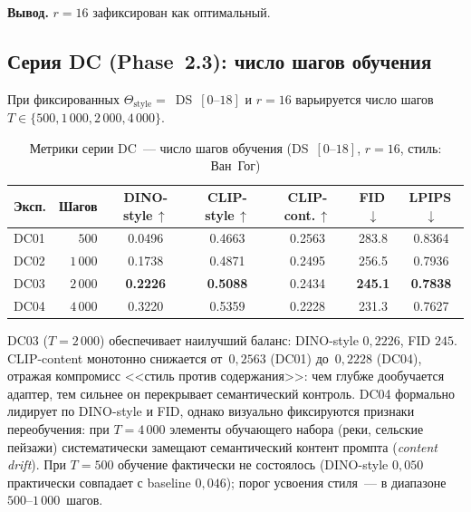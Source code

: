 \textbf{Вывод.} $r{=}16$ зафиксирован как оптимальный.

\subsection{Серия DC (Phase~2.3): число шагов обучения}
\label{sec:results_phase2_dc}

При фиксированных $\Theta_\text{style}{=}$~DS~$[0\text{--}18]$ и $r{=}16$ варьируется число шагов $T \in \{500, 1\,000, 2\,000, 4\,000\}$.

\begin{table}[h]
\centering
\caption{Метрики серии DC~--- число шагов обучения (DS~$[0\text{–}18]$, $r{=}16$, стиль: Ван~Гог)}
\label{tab:phase2_dc_metrics}
\begingroup\small
\begin{tabular}{lrccccc}
\hline
\textbf{Эксп.} & \textbf{Шагов} & \textbf{DINO-style\,$\uparrow$} & \textbf{CLIP-style\,$\uparrow$} & \textbf{CLIP-cont.\,$\uparrow$} & \textbf{FID\,$\downarrow$} & \textbf{LPIPS\,$\downarrow$} \\
\hline
DC01 & $500$    & 0.0496          & 0.4663          & 0.2563          & 283.8          & 0.8364          \\
DC02 & $1\,000$ & 0.1738          & 0.4871          & 0.2495          & 256.5          & 0.7936          \\
DC03 & $2\,000$ & \textbf{0.2226} & \textbf{0.5088} & 0.2434          & \textbf{245.1} & \textbf{0.7838} \\
DC04 & $4\,000$ & 0.3220          & 0.5359          & 0.2228          & 231.3          & 0.7627          \\
\hline
\end{tabular}\endgroup
\end{table}

DC03 ($T{=}2\,000$) обеспечивает наилучший баланс: DINO-style $0{,}2226$, FID $245$. CLIP-content монотонно снижается от~$0{,}2563$ (DC01) до~$0{,}2228$ (DC04), отражая компромисс <<стиль против содержания>>: чем глубже дообучается адаптер, тем сильнее он перекрывает семантический контроль. DC04 формально лидирует по DINO-style и FID, однако визуально фиксируются признаки переобучения: при $T{=}4\,000$ элементы обучающего набора (реки, сельские пейзажи) систематически замещают семантический контент промпта (\textit{content drift}). При $T{=}500$ обучение фактически не состоялось (DINO-style $0{,}050$ практически совпадает с baseline $0{,}046$); порог усвоения стиля~--- в диапазоне $500$--$1\,000$~шагов.

